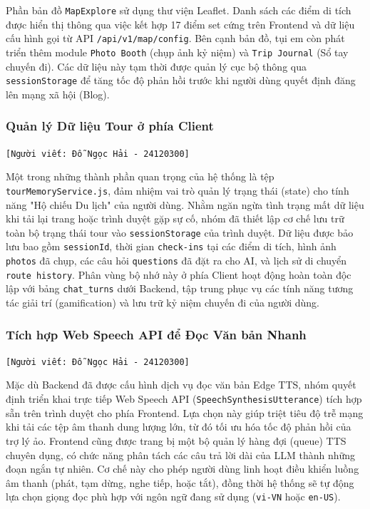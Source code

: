 Phần bản đồ \texttt{MapExplore} sử dụng thư viện Leaflet. Danh sách các điểm di tích được hiển thị thông qua việc kết hợp 17 điểm set cứng trên Frontend và dữ liệu cấu hình gọi từ API \texttt{/api/v1/map/config}. Bên cạnh bản đồ, tụi em còn phát triển thêm module \texttt{Photo Booth} (chụp ảnh kỷ niệm) và \texttt{Trip Journal} (Sổ tay chuyến đi). Các dữ liệu này tạm thời được quản lý cục bộ thông qua \texttt{sessionStorage} để tăng tốc độ phản hồi trước khi người dùng quyết định đăng lên mạng xã hội (Blog).

\subsubsection{Quản lý Dữ liệu Tour ở phía Client}
\texttt{[Người viết: Đỗ Ngọc Hải - 24120300]}

Một trong những thành phần quan trọng của hệ thống là tệp \texttt{tourMemoryService.js}, đảm nhiệm vai trò quản lý trạng thái (state) cho tính năng "Hộ chiếu Du lịch" của người dùng. Nhằm ngăn ngừa tình trạng mất dữ liệu khi tải lại trang hoặc trình duyệt gặp sự cố, nhóm đã thiết lập cơ chế lưu trữ toàn bộ trạng thái tour vào \texttt{sessionStorage} của trình duyệt. Dữ liệu được bảo lưu bao gồm \texttt{sessionId}, thời gian \texttt{check-ins} tại các điểm di tích, hình ảnh \texttt{photos} đã chụp, các câu hỏi \texttt{questions} đã đặt ra cho AI, và lịch sử di chuyển \texttt{route history}. Phân vùng bộ nhớ này ở phía Client hoạt động hoàn toàn độc lập với bảng \texttt{chat\_turns} dưới Backend, tập trung phục vụ các tính năng tương tác giải trí (gamification) và lưu trữ kỷ niệm chuyến đi của người dùng.

\subsubsection{Tích hợp Web Speech API để Đọc Văn bản Nhanh}
\texttt{[Người viết: Đỗ Ngọc Hải - 24120300]}

Mặc dù Backend đã được cấu hình dịch vụ đọc văn bản Edge TTS, nhóm quyết định triển khai trực tiếp Web Speech API (\texttt{SpeechSynthesisUtterance}) tích hợp sẵn trên trình duyệt cho phía Frontend. Lựa chọn này giúp triệt tiêu độ trễ mạng khi tải các tệp âm thanh dung lượng lớn, từ đó tối ưu hóa tốc độ phản hồi của trợ lý ảo. Frontend cũng được trang bị một bộ quản lý hàng đợi (queue) TTS chuyên dụng, có chức năng phân tách các câu trả lời dài của LLM thành những đoạn ngắn tự nhiên. Cơ chế này cho phép người dùng linh hoạt điều khiển luồng âm thanh (phát, tạm dừng, nghe tiếp, hoặc tắt), đồng thời hệ thống sẽ tự động lựa chọn giọng đọc phù hợp với ngôn ngữ đang sử dụng (\texttt{vi-VN} hoặc \texttt{en-US}).

